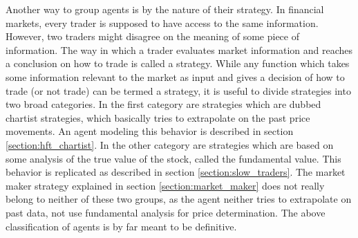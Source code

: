 Another way to group agents is by the nature of their strategy. In financial markets, every trader is supposed to have access to the same information. However, two traders might disagree on the meaning of some piece of information. The way in which a trader evaluates market information and reaches a conclusion on how to trade is called a strategy. While any function which takes some information relevant to the market as input and gives a decision of how to trade (or not trade) can be termed a strategy, it is useful to divide strategies into two broad categories. In the first category are strategies which are dubbed chartist strategies, which basically tries to extrapolate on the past price movements. An agent modeling this behavior is described in section \ref{section:hft_chartist}. In the other category are strategies which are based on some analysis of the true value of the stock, called the fundamental value. This behavior is replicated as described in section \ref{section:slow_traders}. The market maker strategy explained in section \ref{section:market_maker} does not really belong to neither of these two groups, as the agent neither tries to extrapolate on past data, not use fundamental analysis for price determination. The above classification of agents is by far meant to be definitive. 





